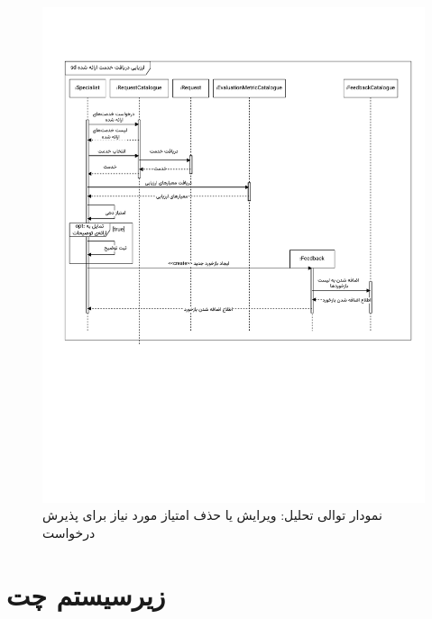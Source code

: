 \begin{figure}[ht!]
	\centering
	\includegraphics[scale=0.8, page=10]{figs/OOD-Sequence-3.pdf}
	\caption{نمودار توالی تحلیل: ویرایش یا حذف امتیاز مورد نیاز برای پذیرش درخواست}
\end{figure}
\FloatBarrier
\newpage



\section{زیرسیستم چت}


